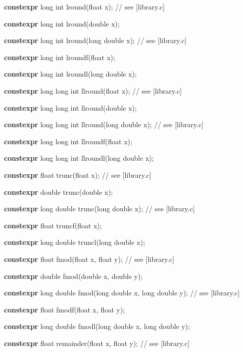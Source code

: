 \documentclass[prd,preprint,amsmath,amssymb,nofootinbib,eqsecnum]{revtex4-1}
\newcommand{\highlight}[1]{{\bf #1}}
\begin{document}
{\vspace{2ex}

\highlight{constexpr} long int lround(float x); // see [library.c]

\highlight{constexpr} long int lround(double x);

\highlight{constexpr} long int lround(long double x); // see [library.c]

\highlight{constexpr} long int lroundf(float x);

\highlight{constexpr} long int lroundl(long double x);

\vspace{2ex}

\highlight{constexpr} long long int llround(float x); // see [library.c]

\highlight{constexpr} long long int llround(double x);

\highlight{constexpr} long long int llround(long double x); // see [library.c]

\highlight{constexpr} long long int llroundf(float x);

\highlight{constexpr} long long int llroundl(long double x);

\vspace{2ex}

\highlight{constexpr} float trunc(float x); // see [library.c]

\highlight{constexpr} double trunc(double x);

\highlight{constexpr} long double trunc(long double x); // see [library.c]

\highlight{constexpr} float truncf(float x);

\highlight{constexpr} long double truncl(long double x);

\vspace{2ex}

\highlight{constexpr} float fmod(float x, float y); // see [library.c]

\highlight{constexpr} double fmod(double x, double y);

\highlight{constexpr} long double fmod(long double x, long double y); // see [library.c]

\highlight{constexpr} float fmodf(float x, float y);

\highlight{constexpr} long double fmodl(long double x, long double y);

\vspace{2ex}

\highlight{constexpr} float remainder(float x, float y); // see [library.c]

}
\end{document}
